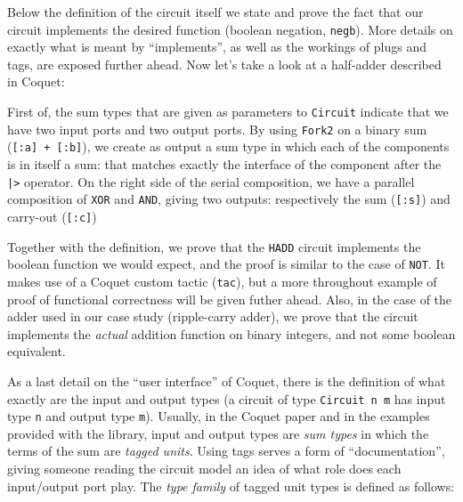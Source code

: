 \documentclass[a4paper]{article}
\begin{document}
                Below the definition of the circuit itself we state and prove the fact that our
                circuit implements the desired function (boolean negation, \texttt{negb}). More
                details on exactly what is meant by ``implements'', as well as the workings of plugs
                and tags, are exposed further ahead. Now let's take a look at a half-adder
                described in Coquet:


                First of, the sum types that are given as parameters to \texttt{Circuit} indicate
                that we have two input ports and two output ports. By using \texttt{Fork2} on a
                binary sum (\texttt{[:a] + [:b]}), we create as output a sum type in which each of
                the components is in itself a sum: that matches exactly the interface of the
                component after the \texttt{|>} operator. On the right side of the serial
                composition, we have a parallel composition of \texttt{XOR} and \texttt{AND}, giving
                two outputs: respectively the sum (\texttt{[:s]}) and carry-out (\texttt{[:c]}) 

                Together with the definition, we prove that the \texttt{HADD} circuit implements the
                boolean function we would expect, and the proof is similar to the case of
                \texttt{NOT}. It makes use of a Coquet custom tactic (\texttt{tac}), but a more
                throughout example of proof of functional correctness will be given futher ahead.
                Also, in the case of the adder used in our case study (ripple-carry adder), we prove
                that the circuit implements the \emph{actual} addition function on binary integers,
                and not some boolean equivalent.

                As a last detail on the ``user interface'' of Coquet, there is the definition of
                what exactly are the input and output types (a circuit of type \texttt{Circuit n m}
                has input type \texttt{n} and output type \texttt{m}). Usually, in the Coquet
                paper\cite{coquet2011} and in the examples provided with the library, input and
                output types are \emph{sum types} in which the terms of the sum are \emph{tagged
                    units}. Using tags serves a form of ``documentation'', giving someone reading
                the circuit model an idea of what role does each input/output port play. The
                \emph{type family} of tagged unit types is defined as follows:
\end{document}

